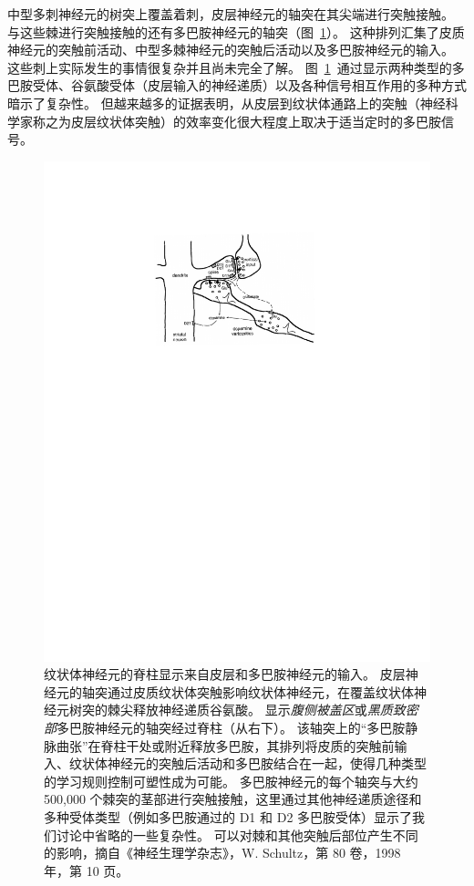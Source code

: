 中型多刺神经元的树突上覆盖着刺，皮层神经元的轴突在其尖端进行突触接触。
与这些棘进行突触接触的还有多巴胺神经元的轴突（图~\ref{fig:12_2}）。
这种排列汇集了皮质神经元的突触前活动、中型多棘神经元的突触后活动以及多巴胺神经元的输入。
这些刺上实际发生的事情很复杂并且尚未完全了解。
图~\ref{fig:12_2}~通过显示两种类型的多巴胺受体、谷氨酸受体（皮层输入的神经递质）以及各种信号相互作用的多种方式暗示了复杂性。
但越来越多的证据表明，从皮层到纹状体通路上的突触（神经科学家称之为皮层纹状体突触）的效率变化很大程度上取决于适当定时的多巴胺信号。



\begin{figure}[!htb]
	\centering
	\includegraphics[width=0.7\linewidth]{chap12/fig_12_2}
	\caption{纹状体神经元的脊柱显示来自皮层和多巴胺神经元的输入。
		皮层神经元的轴突通过皮质纹状体突触影响纹状体神经元，在覆盖纹状体神经元树突的棘尖释放神经递质谷氨酸。
		显示\textit{腹侧被盖区}或\textit{黑质致密部}多巴胺神经元的轴突经过脊柱（从右下）。
		该轴突上的“多巴胺静脉曲张”在脊柱干处或附近释放多巴胺，其排列将皮质的突触前输入、纹状体神经元的突触后活动和多巴胺结合在一起，使得几种类型的学习规则控制可塑性成为可能。
		多巴胺神经元的每个轴突与大约 500,000 个棘突的茎部进行突触接触，这里通过其他神经递质途径和多种受体类型（例如多巴胺通过的 D1 和 D2 多巴胺受体）显示了我们讨论中省略的一些复杂性。
		可以对棘和其他突触后部位产生不同的影响，摘自《神经生理学杂志》，W. Schultz，第 80 卷，1998 年，第 10 页。
		\label{fig:12_2}}
\end{figure}



